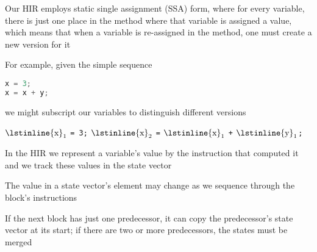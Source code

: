 \documentclass[8pt,a4paper,compress]{beamer}
\newcommand{\subs}[2]{${#1}_{#2}$}
\begin{document}
\begin{frame}[fragile]
\pause

Our HIR employs static single assignment (SSA) form, where for every variable, there is just one place in the method where that variable is assigned a value, which means that when a variable is re-assigned in the method, one must create a new version for it

\pause
\bigskip

For example, given the simple sequence
\begin{lstlisting}[language=Java,style=focusin]
x = 3;
x = x + y;
\end{lstlisting}
we might subscript our variables to distinguish different versions
\begin{production}
\subs{\text{\lstinline{x}}}{\text{1}} \lstinline{= 3;}
\subs{\text{\lstinline{x}}}{\text{2}} \lstinline{=} \subs{\text{\lstinline{x}}}{\text{1}} \lstinline{+} \subs{\text{\lstinline{y}}}{\text{1}}\lstinline{;}
\end{production}

\pause
\bigskip

In the HIR we represent a variable's value by the instruction that computed it and we track these values in the state vector

\pause
\bigskip

The value in a state vector's element may change as we sequence through the block's instructions

\pause
\bigskip

If the next block has just one predecessor, it can copy the predecessor's state vector at its start; if there are two or more predecessors, the states must be merged
\end{frame}
\end{document}
